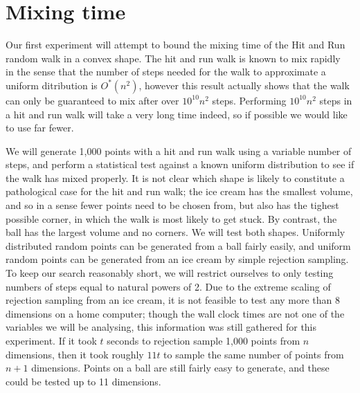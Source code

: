 \section{Mixing time}\label{sec_mix}

Our first experiment will attempt to bound the mixing time of the Hit and Run random walk in a convex shape. The hit and run walk is known to mix rapidly~\cite{Lovasz98, Lovasz05} in the sense that the number of steps needed for the walk to approximate a uniform ditribution is $O^{*}(n^2)$, however this result actually shows that the walk can only be guaranteed to mix after over $10^{10} n^2$ steps. Performing $10^{10} n^2$ steps in a hit and run walk will take a very long time indeed, so if possible we would like to use far fewer.

We will generate 1,000 points with a hit and run walk using a variable number of steps, and perform a statistical test against a known uniform distribution to see if the walk has mixed properly. It is not clear which shape is likely to constitute a pathological case for the hit and run walk; the ice cream has the smallest volume, and so in a sense fewer points need to be chosen from, but also has the tighest possible corner, in which the walk is most likely to get stuck. By contrast, the ball has the largest volume and no corners. We will test both shapes. Uniformly distributed random points can be generated from a ball fairly easily, and uniform random points can be generated from an ice cream by simple rejection sampling. To keep our search reasonably short, we will restrict ourselves to only testing numbers of steps equal to natural powers of 2. Due to the extreme scaling of rejection sampling from an ice cream, it is not feasible to test any more than 8 dimensions on a home computer; though the wall clock times are not one of the variables we will be analysing, this information was still gathered for this experiment. If it took $t$ seconds to rejection sample 1,000 points from $n$ dimensions, then it took roughly $11t$ to sample the same number of points from $n+1$ dimensions. Points on a ball are still fairly easy to generate, and these could be tested up to 11 dimensions.

